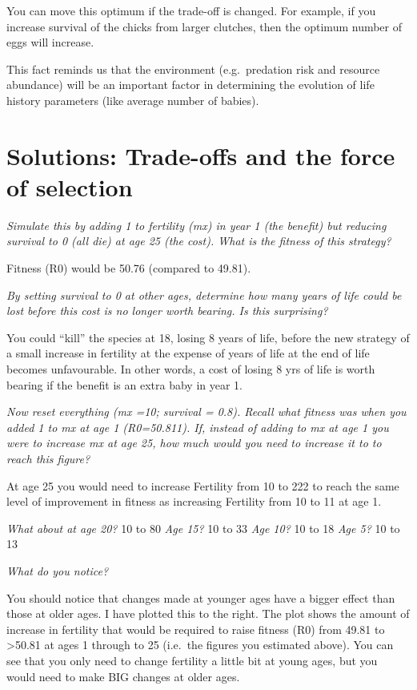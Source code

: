 \documentclass[
  a4paper]{book}
\begin{document}
You can move this optimum if the trade-off is changed. For example, if you increase survival of the chicks from larger clutches, then the optimum number of eggs will increase.

This fact reminds us that the environment (e.g.~predation risk and resource abundance) will be an important factor in determining the evolution of life history parameters (like average number of babies).

\section{Solutions: Trade-offs and the force of selection}\label{solutions-trade-offs-and-the-force-of-selection}

\emph{Simulate this by adding 1 to fertility (mx) in year 1 (the benefit) but reducing survival to 0 (all die) at age 25 (the cost). What is the fitness of this strategy?}

Fitness (R0) would be 50.76 (compared to 49.81).

\emph{By setting survival to 0 at other ages, determine how many years of life could be lost before this cost is no longer worth bearing. Is this surprising?}

You could ``kill'' the species at 18, losing 8 years of life, before the new strategy of a small increase in fertility at the expense of years of life at the end of life becomes unfavourable. In other words, a cost of losing 8 yrs of life is worth bearing if the benefit is an extra baby in year 1.

\emph{Now reset everything (mx =10; survival = 0.8). Recall what fitness was when you added 1 to mx at age 1 (R0=50.811).
If, instead of adding to mx at age 1 you were to increase mx at age 25, how much would you need to increase it to to reach this figure?}

At age 25 you would need to increase Fertility from 10 to 222 to reach the same level of improvement in fitness as increasing Fertility from 10 to 11 at age 1.

\emph{What about at age 20?} 10 to 80
\emph{Age 15?} 10 to 33
\emph{Age 10?} 10 to 18
\emph{Age 5?} 10 to 13

\emph{What do you notice?}

You should notice that changes made at younger ages have a bigger effect than those at older ages. I have plotted this to the right. The plot shows the amount of increase in fertility that would be required to raise fitness (R0) from 49.81 to \textgreater50.81 at ages 1 through to 25 (i.e.~the figures you estimated above). You can see that you only need to change fertility a little bit at young ages, but you would need to make BIG changes at older ages.
\end{document}
